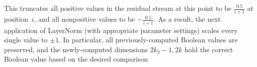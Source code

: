     This truncates all positive values in the residual stream at this point to be $\frac{0.5}{i+1}$ at position~$i$, and all nonpositive values to be $-\frac{0.5}{i+1}$. As a result, the next application of LayerNorm (with appropriate parameter settings) scales every single value to $\pm 1$. In particular, all previously-computed Boolean values are preserved, and the newly-computed dimensions $2k_3-1,2k$ hold the correct Boolean value based on the desired comparison